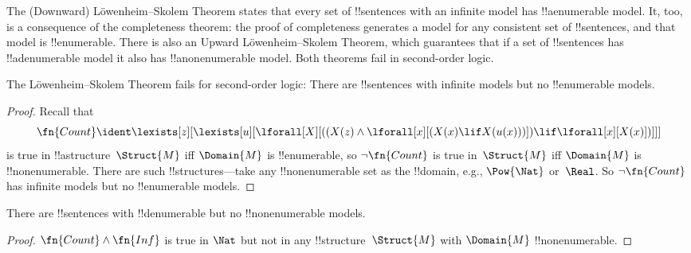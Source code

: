 \documentclass[../../../include/open-logic-section]{subfiles}
\begin{document}

\begin{explain}
The (Downward) L\"owenheim--Skolem Theorem states that every set of
!!{sentence}s with an infinite model has !!a{enumerable} model.  It,
too, is a consequence of the completeness theorem: the proof of
completeness generates a model for any consistent set of
!!{sentence}s, and that model is !!{enumerable}.  There is also an
Upward L\"owenheim--Skolem Theorem, which guarantees that if a set of
!!{sentence}s has !!a{denumerable} model it also has
!!a{nonenumerable} model.  Both theorems fail in second-order logic.
\end{explain}


\begin{thm}
 The L\"owenheim--Skolem Theorem fails for
second-order logic: There are !!{sentence}s with infinite models but
no !!{enumerable} models.
\end{thm}

\begin{proof}
Recall that 
\[
\fn{Count} \ident \lexists[z][\lexists[u][\lforall[X][((X(z) \land
      \lforall[x][(X(x) \lif X(u(x)))]) \lif \lforall[x][X(x)])]]]
\]
is true in !!a{structure}~$\Struct{M}$ iff $\Domain{M}$ is
!!{enumerable}, so $\lnot\fn{Count}$ is true in~$\Struct{M}$
iff $\Domain{M}$ is !!{nonenumerable}.  There are
such !!{structure}s---take any !!{nonenumerable} set as the
!!{domain}, e.g., $\Pow{\Nat}$ or~$\Real$. So $\lnot \fn{Count}$ 
has infinite models but no !!{enumerable} models.
\end{proof}

\begin{thm}
There are !!{sentence}s with !!{denumerable} but no
!!{nonenumerable} models.
\end{thm}

\begin{proof}
$\fn{Count} \land \fn{Inf}$ is true in $\Nat$ but not in any
  !!{structure}~$\Struct{M}$ with $\Domain{M}$ !!{nonenumerable}.
\end{proof}
\end{document}
